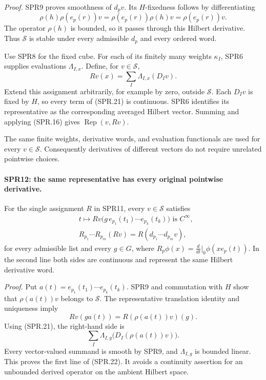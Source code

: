 \documentclass[11pt,a4paper]{article}
\numberwithin{equation}{section}
\theoremstyle{remark}\newtheorem{remark}[theorem]{Remark}
\begin{document}
\emph{Proof.}
SPR9 proves smoothness of \(d_pv\).  Its \(H\)-fixedness follows by
differentiating
\[
       \rho(h)\rho(e_p(r))v=\rho(e_p(r))\rho(h)v
                           =\rho(e_p(r))v.
\]
The operator \(\rho(h)\) is bounded, so it passes through this
Hilbert derivative.  Thus \(\mathcal S\) is stable under every
admissible \(d_p\) and every ordered word.

Use SPR8 for the fixed cube.  For each of its finitely many
weights \(\kappa_I\), SPR6 supplies evaluations
\(\Lambda_{I,x}\).  Define, for \(v\in\mathcal S\),
\[
                       Rv(x)=\sum_I\Lambda_{I,x}(D_Iv).
 \tag{SPR.21}
\]
Extend this assignment arbitrarily, for example by zero, outside
\(\mathcal S\).  Each \(D_Iv\) is fixed by \(H\), so every term
of (SPR.21) is continuous.
SPR6 identifies its representative as the corresponding averaged
Hilbert vector.  Summing and applying (SPR.16) gives
\(\operatorname{Rep}(v,Rv)\).

The same finite weights, derivative words, and evaluation
functionals are used for every \(v\in\mathcal S\).
Consequently derivatives of different vectors do not require
unrelated pointwise choices.

\paragraph{SPR12: the same representative has every original pointwise derivative.}
\label{claim:SPR12}
For the single assignment \(R\) in SPR11, every
\(v\in\mathcal S\) satisfies
\[
\begin{split}
 &t\longmapsto Rv\bigl(g\,e_{p_1}(t_1)\cdots e_{p_k}(t_k)\bigr)
                                  \text{ is }C^\infty,\\
 &R_{p_1}\cdots R_{p_m}(Rv)=R(d_{p_1}\cdots d_{p_m}v),
\end{split}
\tag{SPR.22}
\]
for every admissible list and every \(g\in G\), where
\(R_p\phi(x)=\frac{d}{dt}|_0\phi(xe_p(t))\).
In the second line both sides are continuous and represent the
same Hilbert derivative word.

\emph{Proof.}
Put \(a(t)=e_{p_1}(t_1)\cdots e_{p_k}(t_k)\).
SPR9 and commutation with \(H\) show that \(\rho(a(t))v\)
belongs to \(\mathcal S\).
The representative translation identity and uniqueness imply
\[
                     Rv(ga(t))=R(\rho(a(t))v)(g).
 \tag{SPR.23}
\]
Using (SPR.21), the right-hand side is
\[
             \sum_I\Lambda_{I,g}\bigl(D_I(\rho(a(t))v)\bigr).
\]
Every vector-valued summand is smooth by SPR9, and
\(\Lambda_{I,g}\) is bounded linear.  This proves the first line
of (SPR.22).  It avoids a continuity assertion for an unbounded
derived operator on the ambient Hilbert space.
\end{document}
